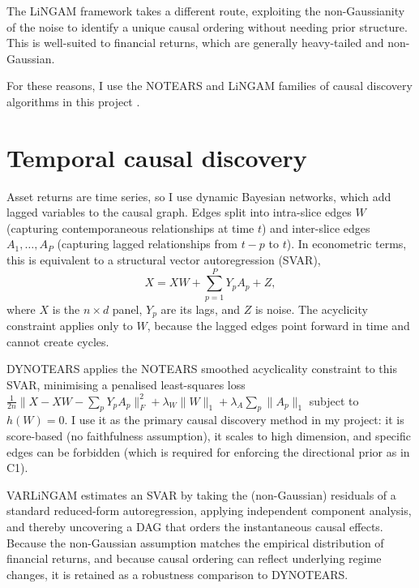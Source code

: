 \documentclass[12pt, a4paper]{report}
\begin{document}
The LiNGAM framework
\cite{shimizu2006lingam} takes a different route, exploiting the non-Gaussianity of the noise
to identify a unique causal ordering without needing prior structure. 
This is well-suited to
financial returns, which are generally heavy-tailed and non-Gaussian.

For these reasons, I use the
NOTEARS and LiNGAM families of causal discovery algorithms in this project \cite{kaddour2022causalml,silva_causalinf}.

\section{Temporal causal discovery}
\label{sec:temporal-cd}

Asset returns are time series, so I use dynamic Bayesian networks, which add lagged
variables to the causal graph.
Edges split into intra-slice edges $W$ (capturing contemporaneous
relationships at time $t$) and inter-slice edges $A_1, \ldots, A_P$ (capturing lagged
relationships from $t-p$ to $t$).
In econometric terms, this is equivalent to a structural vector autoregression (SVAR),
\begin{equation}
  X = X W + \sum_{p=1}^{P} Y_p A_p + Z,
\end{equation}
where $X$ is the $n \times d$ panel, $Y_p$ are its lags, and $Z$ is noise. The acyclicity
constraint applies only to $W$, because the lagged edges point forward in time and cannot create
cycles.

DYNOTEARS \cite{pamfil2020dynotears} applies the NOTEARS smoothed acyclicality constraint to this SVAR, minimising a penalised least-squares loss
\(
  \tfrac{1}{2n}\lVert X - XW - \sum_p Y_p A_p\rVert_F^2
  + \lambda_W \lVert W\rVert_1 + \lambda_A \sum_p \lVert A_p\rVert_1
\)
subject to $h(W)=0$. I use it as the primary causal discovery method in my project: it is score-based (no faithfulness assumption), it scales to high dimension, and specific edges can be forbidden (which
is required for enforcing the directional prior as in C1).

VARLiNGAM \cite{hyvarinen2010varlingam} estimates an SVAR by taking the (non-Gaussian) residuals of a standard reduced-form autoregression, applying independent component analysis, and thereby uncovering a DAG that orders the instantaneous causal effects.
Because the non-Gaussian assumption matches the empirical distribution of financial returns, 
and because causal ordering can reflect underlying regime changes, it is retained as a robustness comparison to DYNOTEARS.
\end{document}
